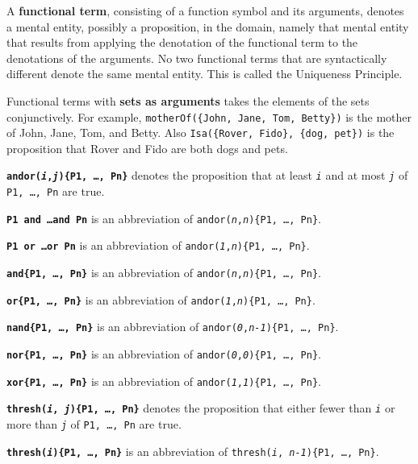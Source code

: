 \documentclass{book}
\begin{document}
A \textbf{functional term}, consisting of a function symbol and its
arguments, denotes a mental entity, possibly a proposition, in the
domain, namely that mental entity that results from applying the
denotation of the functional term to the denotations of the
arguments.  No two functional terms that are syntactically different
denote the same mental entity.  This is called the Uniqueness
Principle.

Functional terms with \textbf{sets as arguments} takes the elements of
the sets conjunctively.  For example, \texttt{motherOf(\{John, Jane,
    Tom, Betty\})} is the mother of John, Jane, Tom, and Betty.  Also\linebreak
\texttt{Isa(\{Rover, Fido\}, \{dog, pet\})} is the proposition that Rover
and Fido are both dogs and pets.

\textbf{\texttt{andor(\textit{i},\textit{j})\{P1, \ldots, Pn\}}}
denotes the proposition that at least \texttt{\textit{i}} and at most
\texttt{\textit{j}} of \texttt{P1, \ldots, Pn} are true.

\textbf{\texttt{P1 and \ldots and Pn}} is an abbreviation of
\texttt{andor(\textit{n},\textit{n})\{P1, \ldots, Pn\}}.

\textbf{\texttt{P1 or \ldots or Pn}} is an abbreviation of
\texttt{andor(\textit{1},\textit{n})\{P1, \ldots, Pn\}}.

\textbf{\texttt{and\{P1, \ldots, Pn\}}} is an abbreviation of
\texttt{andor(\textit{n},\textit{n})\{P1, \ldots, Pn\}}.

\textbf{\texttt{or\{P1, \ldots, Pn\}}} is an abbreviation of
\texttt{andor(\textit{1},\textit{n})\{P1, \ldots, Pn\}}.

\textbf{\texttt{nand\{P1, \ldots, Pn\}}} is an abbreviation of
\texttt{andor(\textit{0},\textit{n-1})\{P1, \ldots, Pn\}}.

\textbf{\texttt{nor\{P1, \ldots, Pn\}}} is an abbreviation of
\texttt{andor(\textit{0},\textit{0})\{P1, \ldots, Pn\}}.

\textbf{\texttt{xor\{P1, \ldots, Pn\}}} is an abbreviation of
\texttt{andor(\textit{1},\textit{1})\{P1, \ldots, Pn\}}.

\textbf{\texttt{thresh(\textit{i}, \textit{j})\{P1, \ldots, Pn\}}}
denotes the proposition that either fewer than \texttt{\textit{i}} or
more than \texttt{\textit{j}} of \texttt{P1, \ldots, Pn} are true.

\textbf{\texttt{thresh(\textit{i})\{P1, \ldots, Pn\}}} is an
abbreviation of \texttt{thresh(\textit{i}, \textit{n-1})\{P1,
    \ldots, Pn\}}.
\end{document}
